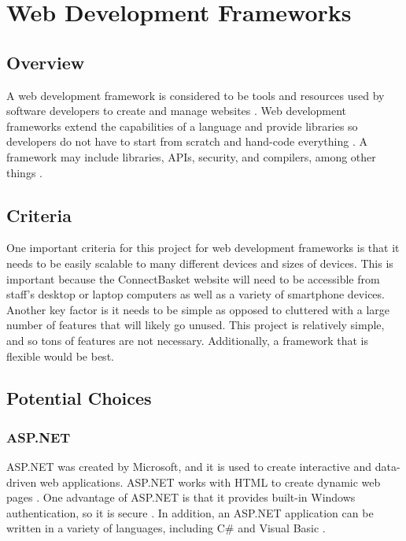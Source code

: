 \documentclass[onecolumn, draftclsnofoot,10pt, compsoc]{IEEEtran}
\begin{document}
\section{Web Development Frameworks}

\subsection{Overview}
A web development framework is considered to be tools and resources used by software developers to create and manage websites \cite{webdevframeworks}. Web development frameworks extend the capabilities of a language and provide libraries so developers do not have to start from scratch and hand-code everything \cite{framework}. A framework may include libraries, APIs, security, and compilers, among other things \cite{framework}.

\subsection{Criteria}
One important criteria for this project for web development frameworks is that it needs to be easily scalable to many different devices and sizes of devices. This is important because the ConnectBasket website will need to be accessible from staff's desktop or laptop computers as well as a variety of smartphone devices. Another key factor is it needs to be simple as opposed to cluttered with a large number of features that will likely go unused. This project is relatively simple, and so tons of features are not necessary. Additionally, a framework that is flexible would be best. 

\subsection{Potential Choices}

\subsubsection{ASP.NET} 
ASP.NET was created by Microsoft, and it is used to create interactive and data-driven web applications\cite{asp.net}. ASP.NET works with HTML to create dynamic web pages \cite{asp}. One advantage of ASP.NET is that it provides built-in Windows authentication, so it is secure \cite{asp}. In addition, an ASP.NET application can be written in a variety of languages, including C\# and Visual Basic \cite{asp.net}. 
\end{document}
